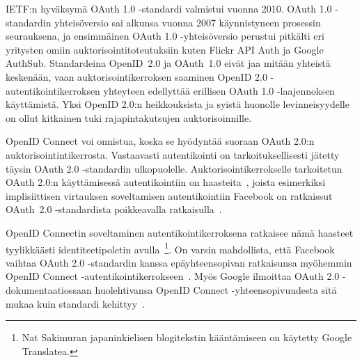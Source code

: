 \documentclass[finnish,gradu]{tktltiki}
\begin{document}
  IETF:n hyväksymä OAuth 1.0 -standardi valmistui vuonna 2010. OAuth 1.0 -stan\-dar\-din yhteisöversio sai alkunsa vuonna 2007 käynnistyneen prosessin seurauksena, ja ensimmäinen OAuth 1.0 -yhteisöversio perustui pitkälti eri yritysten omiin auktorisointitoteutuksiin kuten Flickr API Auth ja Google AuthSub. Standardeina \mbox{OpenID 2.0} ja \mbox{OAuth 1.0} eivät jaa mitään yhteistä keskenään, vaan auktorisointikerroksen saaminen OpenID 2.0 -autenti\-kointi\-kerroksen yhteyteen edellyttää erillisen OAuth 1.0 -laajennoksen käyttämistä. Yksi OpenID 2.0:n heikkouksista ja syistä huonolle levinneisyydelle on ollut kitkainen tuki rajapintakutsujen auktorisoinnille.

  OpenID Connect voi onnistua, koska se hyödyntää suoraan OAuth 2.0:n auktorisointintikerrosta. Vastaavasti autentikointi on tarkoituksellisesti jätetty täysin OAuth 2.0 -standardin ulkopuolelle. Auktorisointikerrokselle tarkoitetun OAuth 2.0:n käyttämisessä autentikointiin on haasteita~\cite{bradley_oauth_authentication_problem_2012, bradley_oauth_implicit_flow_vulnerability_2012}, joista esimerkiksi implisiittisen virtauksen soveltamisen autentikointiin Facebook on ratkaissut \mbox{OAuth 2.0} -standar\-dista poikkeavalla ratkaisulla~\cite{bradley_facebook_id_tokens_2012, facebook_oauth2_signed_request}.

  OpenID Connectin soveltaminen autentikointikerroksena ratkaisee nämä haasteet tyylikkäästi identiteetipoletin avulla~\cite{bradley_openid_c_id_token_2012, bradley_facebook_for_authentication_2012, sakimura_oauth_authentication_problem_2012}\footnote{Nat Sakimuran japaninkielisen blogitekstin kääntämiseen on käytetty Google Translatea.}. On varsin mahdollista, että Facebook vaihtaa OAuth 2.0 -standardin kanssa epäyhteensopivan ratkaisunsa myöhemmin OpenID Connect -autentikointikerrokseen~\cite{bradley_facebook_id_tokens_2012, facebook_oauth2_signed_request}. Myös Google ilmoittaa OAuth 2.0 -dokumentaatiossaan huolehtivansa OpenID Connect -yh\-teen\-sopi\-vuudesta sitä mukaa kuin standardi kehittyy~\cite{google_oauth2_login}.

\end{document}
